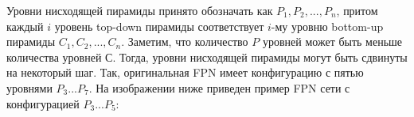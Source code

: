 
Уровни нисходящей пирамиды принято обозначать как $P_1, P_2, ..., P_n$, притом каждый $i$ уровень top-down пирамиды соответствует $i$-му уровню bottom-up пирамиды $C_1, C_2, ..., C_n$. Заметим, что количество $P$ уровней может быть меньше количества уровней $С$. Тогда, уровни нисходящей пирамиды могут быть сдвинуты на некоторый шаг. Так, оригинальная FPN имеет конфигурацию с пятью уровнями $P_3...P_7$. На изображении ниже приведен пример FPN сети с конфигурацией $P_3...P_5$:

